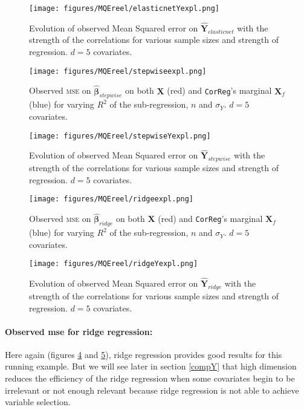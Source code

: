 \documentclass[12pt,a4paper]{report}
\begin{document}
	 \begin{figure}
	 \centering
	  \texttt{[image: figures/MQEreel/elasticnetYexpl.png]}
	  \caption{Evolution of observed Mean Squared error on $\hat{\boldsymbol{Y}}_{elasticnet}$ with the strength of the correlations for various sample sizes and strength of regression. $d=5$ covariates. } \label{MQEelasticnetYexpl}
	\end{figure}
	\begin{figure}[h!]
	\texttt{[image: figures/MQEreel/stepwiseexpl.png]}\label{MSEstepwiseexpl}
	\caption{Observed \textsc{mse} on $\hat{\boldsymbol{\beta}}_{stepwise}$ on both $\boldsymbol{X}$ (red) and {\tt CorReg}'s marginal $\boldsymbol{X}_f$ (blue) for varying $R^2$ of the sub-regression, $n$ and $\sigma_Y$. $d=5$ covariates.}
\end{figure} 
	
	 \begin{figure}
	 \centering
	  \texttt{[image: figures/MQEreel/stepwiseYexpl.png]}
	  \caption{Evolution of observed Mean Squared error on $\hat{\boldsymbol{Y}}_{stepwise}$ with the strength of the correlations for various sample sizes and strength of regression. $d=5$ covariates. } \label{MQEstepwiseYexpl}
	\end{figure}
	\begin{figure}[h!]
	\texttt{[image: figures/MQEreel/ridgeexpl.png]}
	\caption{Observed \textsc{mse} on $\hat{\boldsymbol{\beta}}_{ridge}$ on both $\boldsymbol{X}$ (red) and {\tt CorReg}'s marginal $\boldsymbol{X}_f$ (blue) for varying $R^2$ of the sub-regression, $n$ and $\sigma_Y$. $d=5$ covariates.}\label{MSEridgexpl}
\end{figure} 
	
	 \begin{figure}
	 \centering
	  \texttt{[image: figures/MQEreel/ridgeYexpl.png]}
	  \caption{Evolution of observed Mean Squared error on $\hat{\boldsymbol{Y}}_{ridge}$ with the strength of the correlations for various sample sizes and strength of regression. $d=5$ covariates. } \label{MQEridgeYexpl}
	\end{figure}	


 		\FloatBarrier	
		\paragraph{Observed {\sc mse} for ridge regression:}	
Here again (figures \ref{MSEridgexpl} and \ref{MQEridgeYexpl}), ridge regression provides good results for this running example. But we will see later in section \ref{compY} that high dimension reduces the efficiency of the ridge regression when some covariates begin to be irrelevant or not enough relevant because ridge regression is not able to achieve variable selection. 
\end{document}
